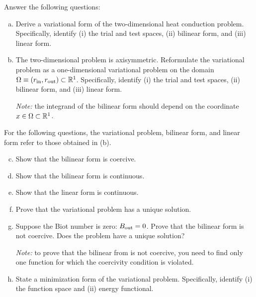 \documentclass[preprint,11pt]{article}
\begin{document}
Answer the following questions:
\begin{enumerate}[(a)]
\item Derive a variational form of the two-dimensional heat conduction problem.  Specifically, identify (i) the trial and test spaces, (ii) bilinear form, and (iii) linear form.
\item The two-dimensional problem is axisymmetric. Reformulate the variational problem as a one-dimensional variational problem on the domain $\Omega \equiv (r_{\rm in}, r_{\rm out}) \subset \mathbb{R}^1$.  Specifically, identify (i) the trial and test spaces, (ii) bilinear form, and (iii) linear form.

  \emph{Note:} the integrand of the bilinear form should depend on the coordinate $x \in \Omega \subset \mathbb{R}^1$.
\end{enumerate}
For the following questions, the variational problem, bilinear form, and linear form refer to those obtained in (b).
\begin{enumerate}[(a)]
  \setcounter{enumi}{2}
\item Show that the bilinear form is coercive.
\item Show that the bilinear form is continuous.
\item Show that the linear form is continuous.
\item Prove that the variational problem has a unique solution.
\item Suppose the Biot number is zero: $B_{\rm out} = 0$.  Prove that the bilinear form is not coercive.  Does the problem have a unique solution?

  \emph{Note:} to prove that the bilinear from is not coercive, you need to find only one function for which the coercivity condition is violated.
\item State a minimization form of the variational problem.  Specifically, identify (i) the function space and (ii) energy functional.
\end{enumerate}
\end{document}

